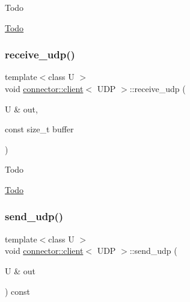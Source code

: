 \begin{DoxyRefDesc}{Todo}
\item[\hyperlink{todo__todo000007}{Todo}]\end{DoxyRefDesc}
\mbox{\label{classconnector_1_1client_3_01UDP_01_4_a4e9796bdc80d16af8b52aa2e7ab991d3}} 
\subsubsection{\texorpdfstring{receive\+\_\+udp()}{receive\_udp()}\hspace{0.1cm}{\footnotesize\ttfamily [2/2]}}
{\footnotesize\ttfamily template$<$class U $>$ \\
void \hyperlink{classconnector_1_1client}{connector\+::client}$<$ U\+DP $>$\+::receive\+\_\+udp (\begin{DoxyParamCaption}\item[{U \&}]{out,  }\item[{const size\+\_\+t}]{buffer }\end{DoxyParamCaption})\hspace{0.3cm}{\ttfamily [inline]}}

\begin{DoxyRefDesc}{Todo}
\item[\hyperlink{todo__todo000008}{Todo}]\end{DoxyRefDesc}
\mbox{\label{classconnector_1_1client_3_01UDP_01_4_abc0b3c6c80093a92137fbd27a604d658}} 
\subsubsection{\texorpdfstring{send\+\_\+udp()}{send\_udp()}\hspace{0.1cm}{\footnotesize\ttfamily [1/2]}}
{\footnotesize\ttfamily template$<$class U $>$ \\
void \hyperlink{classconnector_1_1client}{connector\+::client}$<$ U\+DP $>$\+::send\+\_\+udp (\begin{DoxyParamCaption}\item[{U \&}]{out }\end{DoxyParamCaption}) const\hspace{0.3cm}{\ttfamily [inline]}}



